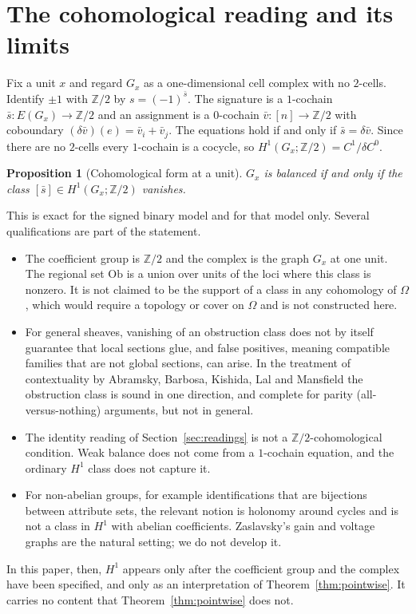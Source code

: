 \documentclass[11pt]{article}
\theoremstyle{plain}
\newtheorem{proposition}[theorem]{Proposition}
\theoremstyle{definition}
\theoremstyle{remark}
\newcommand{\Om}{\Omega}
\newcommand{\Ob}{\mathrm{Ob}}
\newcommand{\Zt}{\mathbb{Z}/2}
\begin{document}
\section{The cohomological reading and its limits}\label{sec:coh}

Fix a unit $x$ and regard $G_x$ as a one-dimensional cell complex with no $2$-cells. Identify $\pm1$ with $\mathbb Z/2$ by $s=(-1)^{\bar s}$. The signature is a $1$-cochain $\bar s:E(G_x)\to\Zt$ and an assignment is a $0$-cochain $\bar v:[n]\to\Zt$ with coboundary $(\delta\bar v)(e)=\bar v_i+\bar v_j$. The equations hold if and only if $\bar s=\delta\bar v$. Since there are no $2$-cells every $1$-cochain is a cocycle, so $H^1(G_x;\Zt)=C^1/\delta C^0$.

\begin{proposition}[Cohomological form at a unit]\label{prop:h1}
$G_x$ is balanced if and only if the class $[\bar s]\in H^1(G_x;\Zt)$ vanishes.
\end{proposition}

This is exact for the signed binary model and for that model only. Several qualifications are part of the statement.
\begin{itemize}[nosep]
\item The coefficient group is $\Zt$ and the complex is the graph $G_x$ at one unit. The regional set $\Ob$ is a union over units of the loci where this class is nonzero. It is not claimed to be the support of a class in any cohomology of $\Om$, which would require a topology or cover on $\Om$ and is not constructed here.
\item For general sheaves, vanishing of an obstruction class does not by itself guarantee that local sections glue, and false positives, meaning compatible families that are not global sections, can arise. In the treatment of contextuality by Abramsky, Barbosa, Kishida, Lal and Mansfield \cite{abramsky2015} the obstruction class is sound in one direction, and complete for parity (all-versus-nothing) arguments, but not in general.
\item The identity reading of Section~\ref{sec:readings} is not a $\Zt$-cohomological condition. Weak balance does not come from a $1$-cochain equation, and the ordinary $H^1$ class does not capture it.
\item For non-abelian groups, for example identifications that are bijections between attribute sets, the relevant notion is holonomy around cycles and is not a class in $H^1$ with abelian coefficients. Zaslavsky's gain and voltage graphs \cite{zaslavsky1982} are the natural setting; we do not develop it.
\end{itemize}
In this paper, then, $H^1$ appears only after the coefficient group and the complex have been specified, and only as an interpretation of Theorem~\ref{thm:pointwise}. It carries no content that Theorem~\ref{thm:pointwise} does not.
\end{document}
